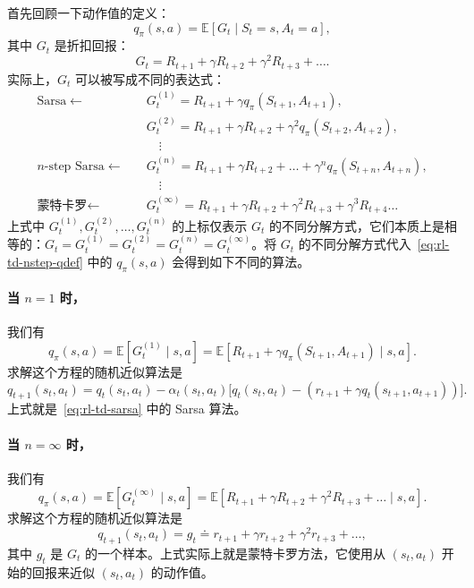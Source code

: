 首先回顾一下动作值的定义：
\begin{equation}
  q_{\pi}(s, a) = \mathbb{E}[G_t \mid S_t = s, A_t = a],
  \label{eq:rl-td-nstep-qdef}
\end{equation}
其中 $G_t$ 是折扣回报：
\[
  G_t = R_{t+1} + \gamma R_{t+2} + \gamma^2 R_{t+3} + \dots .
\]
实际上，$G_t$ 可以被写成不同的表达式：
\begin{align*}
  \mathrm{Sarsa} \longleftarrow \quad & G_t^{(1)} = R_{t+1} + \gamma q_{\pi}(S_{t+1}, A_{t+1}), \\
  & G_t^{(2)} = R_{t+1} + \gamma R_{t+2} + \gamma^2 q_{\pi}(S_{t+2}, A_{t+2}), \\
  & \quad \vdots \\
  n\text{-step Sarsa} \longleftarrow \quad & G_t^{(n)} = R_{t+1} + \gamma R_{t+2} + \dots + \gamma^n q_{\pi}(S_{t+n}, A_{t+n}), \\
  & \quad \vdots \\
  \text{蒙特卡罗} \longleftarrow \quad & G_t^{(\infty)} = R_{t+1} + \gamma R_{t+2} + \gamma^2 R_{t+3} + \gamma^3 R_{t+4} \dots
\end{align*}
上式中 $G_t^{(1)}, G_t^{(2)}, \ldots, G_t^{(n)}$ 的上标仅表示 $G_t$ 的不同分解方式，它们本质上是相等的：$G_t = G_t^{(1)} = G_t^{(2)} = G_t^{(n)} = G_t^{(\infty)}$。将 $G_t$ 的不同分解方式代入~\eqref{eq:rl-td-nstep-qdef} 中的 $q_{\pi}(s, a)$ 会得到如下不同的算法。

\paragraph{当 $n = 1$ 时，} 我们有
\[
  q_{\pi}(s, a) = \mathbb{E}[G_t^{(1)} \mid s, a] = \mathbb{E}[R_{t+1} + \gamma q_{\pi}(S_{t+1}, A_{t+1}) \mid s, a].
\]
求解这个方程的随机近似算法是
\[
  q_{t+1}(s_t, a_t) = q_t(s_t, a_t) - \alpha_t(s_t, a_t) \Big[ q_t(s_t, a_t) - (r_{t+1} + \gamma q_t(s_{t+1}, a_{t+1})) \Big].
\]
上式就是~\eqref{eq:rl-td-sarsa} 中的 Sarsa 算法。

\paragraph{当 $n = \infty$ 时，} 我们有
\[
  q_{\pi}(s, a) = \mathbb{E}[G_t^{(\infty)} \mid s, a] = \mathbb{E}[R_{t+1} + \gamma R_{t+2} + \gamma^2 R_{t+3} + \dots \mid s, a].
\]
求解这个方程的随机近似算法是
\[
  q_{t+1}(s_t, a_t) = g_t \doteq r_{t+1} + \gamma r_{t+2} + \gamma^2 r_{t+3} + \dots ,
\]
其中 $g_t$ 是 $G_t$ 的一个样本。上式实际上就是蒙特卡罗方法，它使用从 $(s_t, a_t)$ 开始的回报来近似 $(s_t, a_t)$ 的动作值。

